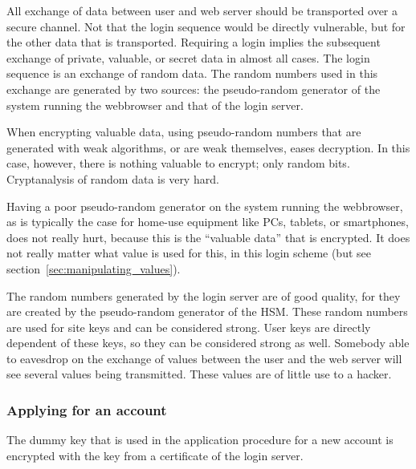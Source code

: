 All exchange of data between user and web server should be transported over a secure channel.
Not that the login sequence would be directly vulnerable,
but for the other data that is transported.
Requiring a login implies the subsequent exchange of private, valuable, or secret data in almost all cases.
The login sequence is an exchange of random data.
The random numbers used in this exchange are generated by two sources:
the pseudo-random generator of the system running the webbrowser and that of the login server.
\par
When encrypting valuable data,
using pseudo-random numbers that are generated with weak algorithms,
or are weak themselves,
eases decryption.
In this case,
however,
there is nothing valuable to encrypt;
only random bits.
Cryptanalysis of random data is very hard.
\par
Having a poor pseudo-random generator on the system running the webbrowser,
as is typically the case for home-use equipment like PCs,
tablets,
or smartphones,
does not really hurt,
because this is the ``valuable data'' that is encrypted.
It does not really matter what value is used for this,
in this login scheme
(but see section~\ref{sec:manipulating_values}).
\par
The random numbers generated by the login server are of good quality,
for they are created by the pseudo-random generator of the HSM.
These random numbers are used for site keys and can be considered strong.
User keys are directly dependent of these keys,
so they can be considered strong as well.
Somebody able to eavesdrop on the exchange of values between the user
and the web server will see several values being transmitted.
These values are of little use to a hacker.
\subsubsection{Applying for an account}
The dummy key that is used in the application procedure for a new account is encrypted with the key
from a certificate of the login server.

